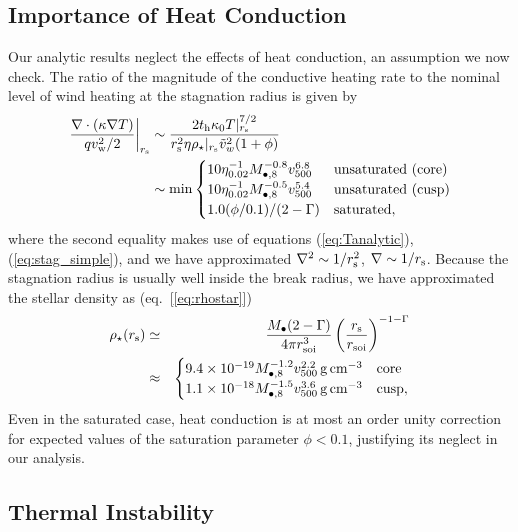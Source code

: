 \documentclass[usenatbib,fleqn]{mn2e}
\begin{document}
\subsection{Importance of Heat Conduction}
\label{sec:conductivity}

Our analytic results neglect the effects of heat conduction, an assumption we now check.  The ratio of the magnitude of the conductive heating rate to the nominal level of wind heating at the stagnation radius is given by
\begin{align}
  \left.\frac{\nabla\cdot(\kappa \nabla T)}{q v_{\rm
w}^{2}/2}\right|_{r_{\rm s}} &\sim \frac{2t_{\rm h}\kappa_0
T|_{r_{\rm s}}^{7/2}}{r_{\rm s}^{2}\eta \rho_{\star}|_{r_{\rm s}} \tilde{v}_{w}^{2}(1+\phi)}
\nonumber \\ &\sim {\rm min}
  \begin{cases}
  10 \eta_{0.02}^{-1}
M_{\bullet,8}^{-0.8} v_{500}^{6.8} &  \text{unsaturated (core)}\\
 10 \eta_{0.02}^{-1}
M_{\bullet,8}^{-0.5} v_{500}^{5.4} &  \text{unsaturated (cusp)}\\
  1.0(\phi/0.1)/(2-\Gamma) & \text{saturated},
  \end{cases}
 \label{eq:rhors}
\end{align}
where the second equality makes use of equations (\ref{eq:Tanalytic}), (\ref{eq:stag_simple}), and we have approximated $\nabla^{2} \sim 1/r_{\rm s}^{2}$, $\nabla \sim 1/r_{\rm s}$.  Because the stagnation radius is usually well inside the break radius, we have approximated the stellar density as (eq.~[\ref{eq:rhostar}])
\begin{eqnarray}
  \rho_{\star}(r_{\rm s}) &\simeq& \frac{M_{\bullet}(2-\Gamma)}{4\pi r_{\rm soi}^{3}}\left(\frac{r_{\rm s}}{r_{\rm soi}}\right)^{-1-\Gamma} \nonumber \\
 &\approx& \begin{cases}
    9.4 \times 10^{-19}M_{\bullet,8}^{-1.2}v_{500}^{2.2}\,{\rm g\,cm^{-3}}
    & \text{core} \\
    1.1 \times 10^{-18} M_{\bullet,8}^{-1.5}v_{500}^{3.6}
    \,{\rm g\,cm^{-3}}  & \text{cusp}, 
  \end{cases}
  \label{eq:rhostarrs}
\end{eqnarray}
Even in the saturated case, heat conduction is at most an order unity correction for expected values of the saturation parameter $\phi < 0.1$, justifying its neglect in our analysis.  

\subsection{Thermal Instability}
\label{sec:instability}
\end{document}
